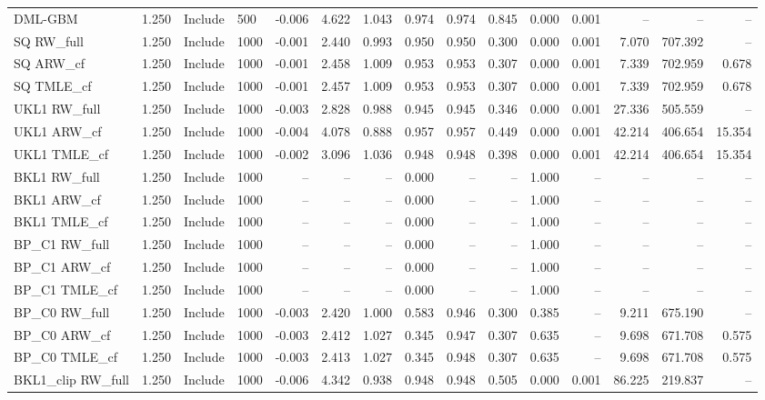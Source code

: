 \begin{tabular}{llllrrrrrrrrrrr}
DML-GBM & 1.250 & Include & 500 & -0.006 & 4.622 & 1.043 & 0.974 & 0.974 & 0.845 & 0.000 & 0.001 & -- & -- & -- \\
SQ RW\_full & 1.250 & Include & 1000 & -0.001 & 2.440 & 0.993 & 0.950 & 0.950 & 0.300 & 0.000 & 0.001 & 7.070 & 707.392 & -- \\
SQ ARW\_cf & 1.250 & Include & 1000 & -0.001 & 2.458 & 1.009 & 0.953 & 0.953 & 0.307 & 0.000 & 0.001 & 7.339 & 702.959 & 0.678 \\
SQ TMLE\_cf & 1.250 & Include & 1000 & -0.001 & 2.457 & 1.009 & 0.953 & 0.953 & 0.307 & 0.000 & 0.001 & 7.339 & 702.959 & 0.678 \\
UKL1 RW\_full & 1.250 & Include & 1000 & -0.003 & 2.828 & 0.988 & 0.945 & 0.945 & 0.346 & 0.000 & 0.001 & 27.336 & 505.559 & -- \\
UKL1 ARW\_cf & 1.250 & Include & 1000 & -0.004 & 4.078 & 0.888 & 0.957 & 0.957 & 0.449 & 0.000 & 0.001 & 42.214 & 406.654 & 15.354 \\
UKL1 TMLE\_cf & 1.250 & Include & 1000 & -0.002 & 3.096 & 1.036 & 0.948 & 0.948 & 0.398 & 0.000 & 0.001 & 42.214 & 406.654 & 15.354 \\
BKL1 RW\_full & 1.250 & Include & 1000 & -- & -- & -- & 0.000 & -- & -- & 1.000 & -- & -- & -- & -- \\
BKL1 ARW\_cf & 1.250 & Include & 1000 & -- & -- & -- & 0.000 & -- & -- & 1.000 & -- & -- & -- & -- \\
BKL1 TMLE\_cf & 1.250 & Include & 1000 & -- & -- & -- & 0.000 & -- & -- & 1.000 & -- & -- & -- & -- \\
BP\_C1 RW\_full & 1.250 & Include & 1000 & -- & -- & -- & 0.000 & -- & -- & 1.000 & -- & -- & -- & -- \\
BP\_C1 ARW\_cf & 1.250 & Include & 1000 & -- & -- & -- & 0.000 & -- & -- & 1.000 & -- & -- & -- & -- \\
BP\_C1 TMLE\_cf & 1.250 & Include & 1000 & -- & -- & -- & 0.000 & -- & -- & 1.000 & -- & -- & -- & -- \\
BP\_C0 RW\_full & 1.250 & Include & 1000 & -0.003 & 2.420 & 1.000 & 0.583 & 0.946 & 0.300 & 0.385 & -- & 9.211 & 675.190 & -- \\
BP\_C0 ARW\_cf & 1.250 & Include & 1000 & -0.003 & 2.412 & 1.027 & 0.345 & 0.947 & 0.307 & 0.635 & -- & 9.698 & 671.708 & 0.575 \\
BP\_C0 TMLE\_cf & 1.250 & Include & 1000 & -0.003 & 2.413 & 1.027 & 0.345 & 0.948 & 0.307 & 0.635 & -- & 9.698 & 671.708 & 0.575 \\
BKL1\_clip RW\_full & 1.250 & Include & 1000 & -0.006 & 4.342 & 0.938 & 0.948 & 0.948 & 0.505 & 0.000 & 0.001 & 86.225 & 219.837 & -- \\

\end{tabular}
